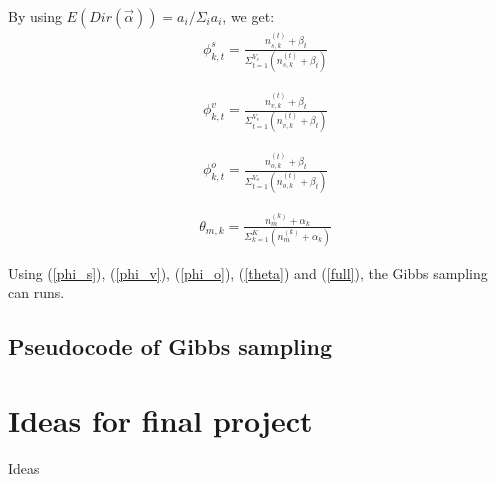 \documentclass{article}
\newtheorem{theorem}{Theorem}
\begin{document}
By using $E(Dir(\vec{\alpha})) = a_i / \Sigma_i a_i$, we get:
\begin{equation}
\begin{aligned} \label{phi_s}
& \phi_{k,t}^s = \frac{n_{s,k}^{(t)} + \beta_t}{\Sigma_{t=1}^{V_s} (n_{s,k}^{(t)} + \beta_t)}
\end{aligned}
\end{equation}

\begin{equation}
\begin{aligned} \label{phi_v}
& \phi_{k,t}^v = \frac{n_{v,k}^{(t)} + \beta_t}{\Sigma_{t=1}^{V_v} (n_{v,k}^{(t)} + \beta_t)}
\end{aligned}
\end{equation}

\begin{equation}
\begin{aligned} \label{phi_o}
& \phi_{k,t}^o = \frac{n_{o,k}^{(t)} + \beta_t}{\Sigma_{t=1}^{V_o} (n_{o,k}^{(t)} + \beta_t)}
\end{aligned}
\end{equation}


\begin{equation}
\begin{aligned} \label{theta}
& \theta_{m,k} = \frac{n_m^{(k)} + \alpha_k}{\Sigma_{k=1}^K (n_m^{(k)} + \alpha_k)}
\end{aligned}
\end{equation}

Using (\ref{phi_s}), (\ref{phi_v}), (\ref{phi_o}), (\ref{theta}) and (\ref{full}), the Gibbs sampling can runs.

\subsection{Pseudocode of Gibbs sampling}


\section{Ideas for final project}

Ideas

 
\end{document}
